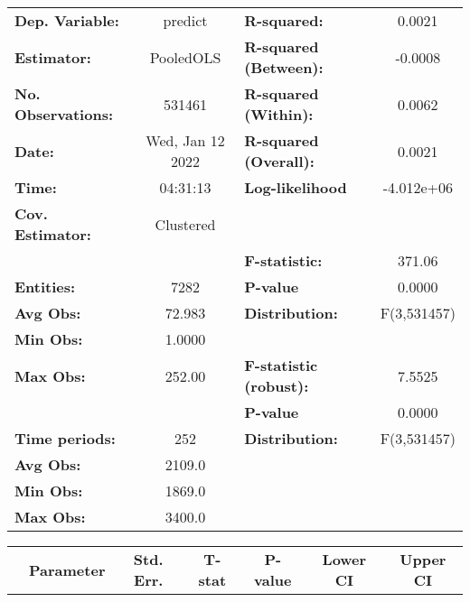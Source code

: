 \begin{center}
\begin{tabular}{lclc}
\toprule
\textbf{Dep. Variable:}    &      predict       & \textbf{  R-squared:         }   &      0.0021      \\
\textbf{Estimator:}        &     PooledOLS      & \textbf{  R-squared (Between):}  &     -0.0008      \\
\textbf{No. Observations:} &       531461       & \textbf{  R-squared (Within):}   &      0.0062      \\
\textbf{Date:}             &  Wed, Jan 12 2022  & \textbf{  R-squared (Overall):}  &      0.0021      \\
\textbf{Time:}             &      04:31:13      & \textbf{  Log-likelihood     }   &    -4.012e+06    \\
\textbf{Cov. Estimator:}   &     Clustered      & \textbf{                     }   &                  \\
\textbf{}                  &                    & \textbf{  F-statistic:       }   &      371.06      \\
\textbf{Entities:}         &        7282        & \textbf{  P-value            }   &      0.0000      \\
\textbf{Avg Obs:}          &       72.983       & \textbf{  Distribution:      }   &   F(3,531457)    \\
\textbf{Min Obs:}          &       1.0000       & \textbf{                     }   &                  \\
\textbf{Max Obs:}          &       252.00       & \textbf{  F-statistic (robust):} &      7.5525      \\
\textbf{}                  &                    & \textbf{  P-value            }   &      0.0000      \\
\textbf{Time periods:}     &        252         & \textbf{  Distribution:      }   &   F(3,531457)    \\
\textbf{Avg Obs:}          &       2109.0       & \textbf{                     }   &                  \\
\textbf{Min Obs:}          &       1869.0       & \textbf{                     }   &                  \\
\textbf{Max Obs:}          &       3400.0       & \textbf{                     }   &                  \\
\bottomrule
\end{tabular}
\begin{tabular}{lcccccc}
                & \textbf{Parameter} & \textbf{Std. Err.} & \textbf{T-stat} & \textbf{P-value} & \textbf{Lower CI} & \textbf{Upper CI}  \\

\end{tabular}
\end{center}
